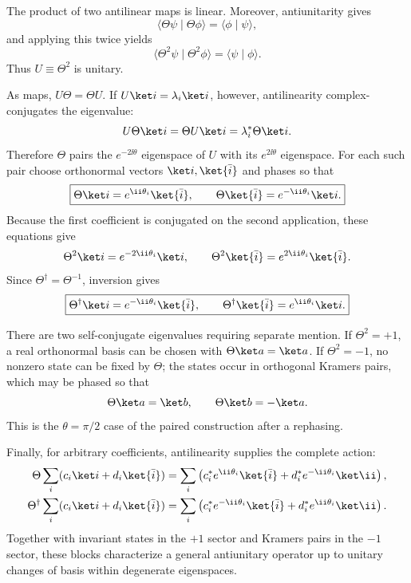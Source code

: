 \begin{enumerate}
The product of two antilinear maps is linear.  Moreover, antiunitarity gives
\[
 \langle\Theta\psi\mid\Theta\phi\rangle
 =\langle\phi\mid\psi\rangle,
\]
and applying this twice yields
\[
 \langle\Theta^2\psi\mid\Theta^2\phi\rangle
 =\langle\psi\mid\phi\rangle.
\]
Thus \(U\equiv\Theta^2\) is unitary.

As maps, \(U\Theta=\Theta U\).  If
\(U\ket i=\lambda_i\ket i\), however, antilinearity complex-conjugates
the eigenvalue:
\[
 U\Theta\ket i=\Theta U\ket i
 =\lambda_i^*\Theta\ket i.
\]
Therefore \(\Theta\) pairs the \(e^{-2\ii\theta}\) eigenspace of \(U\)
with its \(e^{2\ii\theta}\) eigenspace.  For each such pair choose
orthonormal vectors \(\ket i,\ket{\bar i}\) and phases so that
\[
 \boxed{
 \Theta\ket i=e^{\ii\theta_i}\ket{\bar i},
 \qquad
 \Theta\ket{\bar i}=e^{-\ii\theta_i}\ket i. }
\]
Because the first coefficient is conjugated on the second application,
these equations give
\[
 \Theta^2\ket i=e^{-2\ii\theta_i}\ket i,
 \qquad
 \Theta^2\ket{\bar i}=e^{2\ii\theta_i}\ket{\bar i}.
\]
Since \(\Theta^\dagger=\Theta^{-1}\), inversion gives
\[
 \boxed{
 \Theta^\dagger\ket i=e^{-\ii\theta_i}\ket{\bar i},
 \qquad
 \Theta^\dagger\ket{\bar i}=e^{\ii\theta_i}\ket i. }
\]

There are two self-conjugate eigenvalues requiring separate mention.  If
\(\Theta^2=+1\), a real orthonormal basis can be chosen with
\(\Theta\ket a=\ket a\).  If \(\Theta^2=-1\), no nonzero state can be
fixed by \(\Theta\); the states occur in orthogonal Kramers pairs, which
may be phased so that
\[
 \Theta\ket a=\ket b,
 \qquad
 \Theta\ket b=-\ket a.
\]
This is the \(\theta=\pi/2\) case of the paired construction after a
rephasing.

Finally, for arbitrary coefficients, antilinearity supplies the complete
action:
\[
\begin{split}
 \Theta\sum_i(c_i\ket i+d_i\ket{\bar i})
 &=\sum_i\left(c_i^*e^{\ii\theta_i}\ket{\bar i}
 +d_i^*e^{-\ii\theta_i}\ket \ii\right),\\
 \Theta^\dagger\sum_i(c_i\ket i+d_i\ket{\bar i})
 &=\sum_i\left(c_i^*e^{-\ii\theta_i}\ket{\bar i}
 +d_i^*e^{\ii\theta_i}\ket \ii\right).
\end{split}
\]
Together with invariant states in the \(+1\) sector and Kramers pairs in
the \(-1\) sector, these blocks characterize a general antiunitary
operator up to unitary changes of basis within degenerate eigenspaces.
\end{enumerate}
